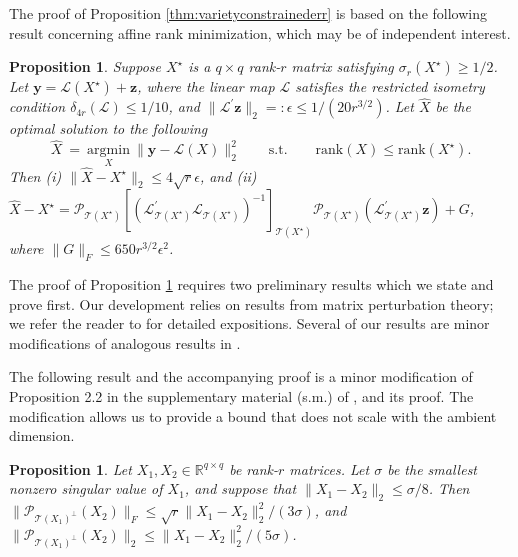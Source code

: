 \documentclass[11pt,letterpaper]{article}
\newtheorem{proposition}[theorem]{Proposition}
\newcommand{\by}{\mathbf{y}}
\newcommand{\bz}{\mathbf{z}}
\newcommand{\ct}{\mathcal{T}}
\newcommand{\cp}{\mathcal{P}}
\begin{document}
The proof of Proposition \ref{thm:varietyconstrainederr} is based on the following result concerning affine rank minimization, which may be of independent interest.

\begin{proposition} \label{thm:varietyconstrainedoptimization}
	Suppose $X^{\star}$ is a $q\times q$ rank-$r$ matrix satisfying $\sigma_r (X^{\star}) \geq 1/2$. Let $\by = \mathcal{L}(X^{\star}) + \bz$, where the linear map $\mathcal{L}$ satisfies the restricted isometry condition $\delta_{4r}(\mathcal{L}) \leq 1/10$, and $\| \mathcal{L}^{\prime} \bz\|_2 =: \epsilon \leq 1 / (20 r^{3/2})$. Let $\hat{X}$ be the optimal solution to the following
	\begin{equation*}
		\hat{X}~=~\underset{X}{\mathrm{argmin}}~\| \by - \mathcal{L}(X) \|^2_2 \quad \quad \mathrm{s.t.} \quad \quad \mathrm{rank}(X) \leq \mathrm{rank}(X^{\star}).
	\end{equation*}
	Then (i) $\| \hat{X} - X^{\star} \|_2 \leq 4 \sqrt{r} \epsilon$, and (ii) $ \hat{X} - X^{\star} = \cp_{\ct(X^{\star})} [(\mathcal{L}^{\prime}_{\ct(X^{\star})}\mathcal{L}_{\ct(X^{\star})})^{-1}]_{\ct(X^{\star})} \cp_{\ct(X^{\star})} (\mathcal{L}_{\ct(X^{\star})}^{\prime} \bz) + G$, where $\|G\|_F \leq 650 r^{3/2} \epsilon^2 $. %
\end{proposition}

The proof of Proposition \ref{thm:varietyconstrainedoptimization} requires two preliminary results which we state and prove first.  Our development relies on results from matrix perturbation theory; we refer the reader to \cite{Kat:66,SteSun:1990} for detailed expositions.  Several of our results are minor modifications of analogous results in \cite{CPW:12}.

The following result and the accompanying proof is a minor modification of Proposition 2.2 in the supplementary material (s.m.) of \cite{CPW:12},  and its proof.  The modification allows us to provide a bound that does not scale with the ambient dimension.

\begin{proposition} \label{thm:lgmmod}
	Let $X_1,X_2 \in \mathbb{R}^{q\times q}$ be rank-$r$ matrices. Let $\sigma$ be the smallest nonzero singular value of $X_1$, and suppose that $\| X_1 - X_2 \|_2 \leq \sigma / 8$. Then $\| \cp_{\ct(X_1)^{\perp}} (X_2) \|_F \leq \sqrt{r} \| X_1 - X_2 \|_2^2 / (3\sigma)$, and $\| \cp_{\ct(X_1)^{\perp}} (X_2) \|_2 \leq \| X_1 - X_2 \|_2^2 / (5\sigma)$.
\end{proposition}
\end{document}
